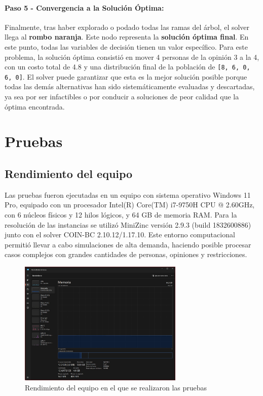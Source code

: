 \documentclass[11pt,letter]{article}
\begin{document}
\paragraph{Paso 5 - Convergencia a la Solución Óptima:}
Finalmente, tras haber explorado o podado todas las ramas del árbol, el solver llega al \textbf{rombo naranja}. Este nodo representa la \textbf{solución óptima final}. En este punto, todas las variables de decisión tienen un valor específico. Para este problema, la solución óptima consistió en mover 4 personas de la opinión 3 a la 4, con un costo total de 4.8 y una distribución final de la población de \texttt{[8, 6, 0, 6, 0]}. El solver puede garantizar que esta es la mejor solución posible porque todas las demás alternativas han sido sistemáticamente evaluadas y descartadas, ya sea por ser infactibles o por conducir a soluciones de peor calidad que la óptima encontrada.

\section{Pruebas}

\subsection{Rendimiento del equipo}
Las pruebas fueron ejecutadas en un equipo con sistema operativo Windows 11 Pro, equipado con un procesador Intel(R) Core(TM) i7-9750H CPU @ 2.60GHz, con 6 núcleos físicos y 12 hilos lógicos, y 64 GB de memoria RAM. Para la resolución de las instancias se utilizó MiniZinc versión 2.9.3 (build 1832600886) junto con el solver COIN-BC 2.10.12/1.17.10. Este entorno computacional permitió llevar a cabo simulaciones de alta demanda, haciendo posible procesar casos complejos con grandes cantidades de personas, opiniones y restricciones.
\begin{figure}[H]
    \centering
    \includegraphics[width=0.7\textwidth]{resources/rendimientodelequipo.jpg}
    \caption{Rendimiento del equipo en el que se realizaron las pruebas}
\end{figure}
\end{document}
